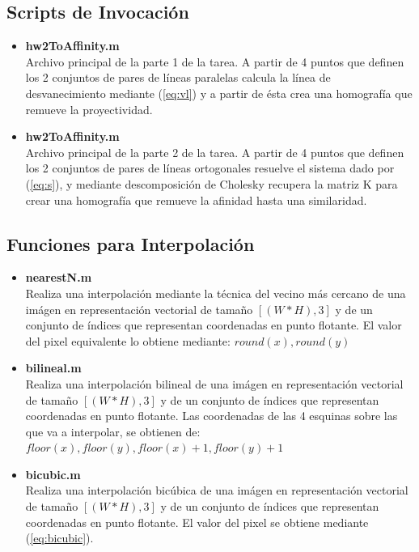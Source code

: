 \documentclass{IEEEtran}
\begin{document}
\subsection{Scripts de Invocación}
\begin{itemize}
\item \textbf{hw2ToAffinity.m} ~\\
Archivo principal de la parte 1 de la tarea.
A partir de 4 puntos que definen los 2 conjuntos de pares de líneas paralelas
calcula la línea de desvanecimiento mediante (\ref{eq:vl}) y
a partir de ésta crea una homografía que remueve la proyectividad.

\item \textbf{hw2ToAffinity.m} ~\\
Archivo principal de la parte 2 de la tarea.
A partir de 4 puntos que definen los 2 conjuntos de pares de líneas ortogonales
resuelve el sistema dado por (\ref{eq:s}), y mediante descomposición
de Cholesky recupera la matriz K para crear una 
homografía que remueve la afinidad hasta una similaridad.

\end{itemize} 

\subsection{Funciones para Interpolación}
\begin{itemize}
\item \textbf{nearestN.m} ~\\
Realiza una interpolación mediante la técnica del vecino más cercano
 de una imágen en representación
vectorial de tamaño $[(W*H) , 3]$ y de un conjunto de índices que
representan coordenadas en punto flotante. 
El valor del pixel equivalente lo obtiene mediante:
 $round(x), round(y)$

\item \textbf{bilineal.m} ~\\
Realiza una interpolación bilineal de una imágen en representación
vectorial de tamaño $[(W*H) , 3]$ y de un conjunto de índices que
representan coordenadas en punto flotante. Las coordenadas de las 4
esquinas sobre las que va a interpolar, se obtienen de:
 $floor(x), floor(y), floor(x)+1, floor(y)+1$

\item \textbf{bicubic.m} ~\\
Realiza una interpolación bicúbica de una imágen en representación
vectorial de tamaño $[(W*H) , 3]$ y de un conjunto de índices que
representan coordenadas en punto flotante. El valor del pixel se
obtiene mediante (\ref{eq:bicubic}).

\end{itemize} 
\end{document}
